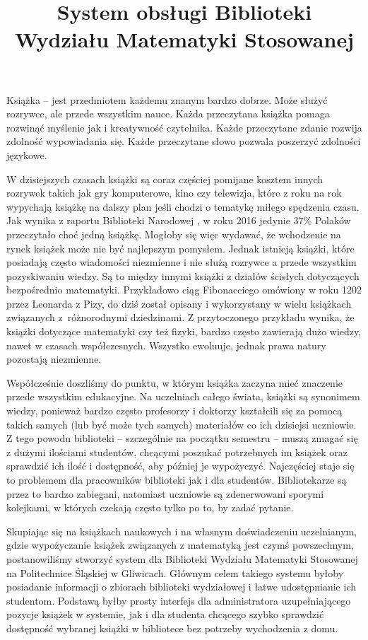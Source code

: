 \documentclass[twoside]{projektInzynierskiMS}
\title{System obsługi Biblioteki Wydziału Matematyki Stosowanej}
\begin{document}
Książka -- jest przedmiotem każdemu znanym bardzo dobrze. Może służyć rozrywce, ale przede wszystkim nauce. Każda przeczytana książka pomaga rozwinąć myślenie jak i kreatywność czytelnika. Każde przeczytane zdanie rozwija zdolność wypowiadania się. 
Każde przeczytane słowo pozwala poszerzyć zdolności językowe.

W dzisiejszych czasach książki są coraz częściej pomijane kosztem innych rozrywek takich jak gry komputerowe, kino czy telewizja, które z roku na rok wypychają książkę na dalszy plan jeśli chodzi o tematykę miłego spędzenia czasu. Jak wynika z raportu Biblioteki Narodowej \cite{raportBN}, w roku 2016 jedynie 37\% Polaków przeczytało choć jedną książkę. Mogłoby się więc wydawać, że wchodzenie na rynek książek może nie być najlepszym pomysłem. Jednak istnieją książki, które posiadają często wiadomości niezmienne i nie służą rozrywce a przede wszystkim pozyskiwaniu wiedzy. Są to między innymi książki z działów ścisłych dotyczących bezpośrednio matematyki. Przykładowo ciąg Fibonacciego omówiony w roku 1202 przez Leonarda z Pizy, do dziś został opisany i wykorzystany w wielu książkach związanych z~różnorodnymi dziedzinami. Z przytoczonego przykładu wynika, że książki dotyczące matematyki czy też fizyki, bardzo często zawierają dużo wiedzy, nawet w czasach współczesnych. Wszystko ewoluuje, jednak prawa natury pozostają niezmienne.

Współcześnie doszliśmy do punktu, w którym książka zaczyna mieć znaczenie przede wszystkim edukacyjne. Na uczelniach całego świata, książki są synonimem wiedzy, ponieważ bardzo często profesorzy i doktorzy kształcili się za pomocą takich samych (lub być może tych samych) materiałów co ich dzisiejsi uczniowie. Z tego powodu biblioteki -- szczególnie na początku semestru -- muszą zmagać się z dużymi ilościami studentów, chcącymi poszukać potrzebnych im książek oraz sprawdzić ich ilość i dostępność, aby później je wypożyczyć. Najczęściej staje się to problemem dla pracowników biblioteki jak i dla studentów. Bibliotekarze są przez to bardzo zabiegani, natomiast uczniowie są zdenerwowani sporymi kolejkami, w których czekają często tylko po to, by zadać pytanie.

Skupiając się na książkach naukowych i na własnym doświadczeniu uczelnianym, gdzie wypożyczanie książek związanych z matematyką jest czymś powszechnym, postanowiliśmy stworzyć system dla Biblioteki Wydziału Matematyki Stosowanej na Politechnice Śląskiej w Gliwicach. Głównym celem takiego systemu byłoby posiadanie informacji o zbiorach biblioteki wydziałowej i łatwe udostępnianie ich studentom. Podstawą byłby prosty interfejs dla administratora uzupełniającego pozycje książek w systemie, jak i dla studenta chcącego szybko sprawdzić dostępność wybranej książki w bibliotece bez potrzeby wychodzenia z domu.
\end{document}
